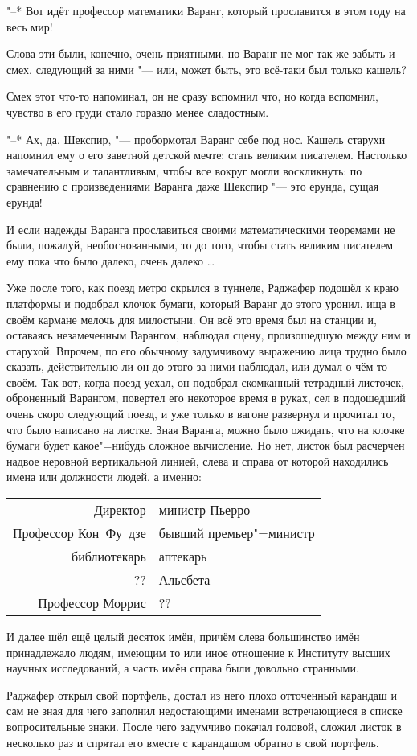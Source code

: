 "--* Вот идёт профессор математики Варанг, который прославится в этом году на
весь мир!

Слова эти были, конечно, очень приятными, но Варанг не мог так же забыть и смех,
следующий за ними "--- или, может быть, это всё-таки был только кашель?

Смех этот что-то напоминал, он не сразу вспомнил что, но когда вспомнил, чувство
в его груди стало гораздо менее сладостным.

"--* Ах, да, Шекспир, "--- пробормотал Варанг себе под нос.
Кашель старухи напомнил ему о его заветной детской мечте: стать великим
писателем.
Настолько замечательным и талантливым, чтобы все вокруг могли воскликнуть: по
сравнению с произведениями Варанга даже Шекспир "--- это ерунда, сущая ерунда!

И если надежды Варанга прославиться своими математическими теоремами не были,
пожалуй, необоснованными, то до того, чтобы стать великим писателем ему пока что
было далеко, очень далеко \ldots

Уже после того, как поезд метро скрылся в туннеле, Раджафер подошёл к краю
платформы и подобрал клочок бумаги, который Варанг до этого уронил, ища в своём
кармане мелочь для милостыни.
Он всё это время был на станции и, оставаясь незамеченным Варангом, наблюдал
сцену, произошедшую между ним и старухой.
Впрочем, по его обычному задумчивому выражению лица трудно было сказать,
действительно ли он до этого за ними наблюдал, или думал о чём-то своём.
Так вот, когда поезд уехал, он подобрал скомканный тетрадный листочек,
оброненный Варангом, повертел его некоторое время в руках, сел в подошедший
очень скоро следующий поезд, и уже только в вагоне развернул и прочитал то, что
было написано на листке.
Зная Варанга, можно было ожидать, что на клочке бумаги будет какое"=нибудь
сложное вычисление.
Но нет, листок был расчерчен надвое неровной вертикальной линией, слева и справа
от которой находились имена или должности людей, а именно:

\begin{table}[h!]
\centering
\begin{tabular}{r|l}
Директор             & министр Пьерро \\
Профессор Кон~Фу~дзе & бывший премьер"=министр \\
библиотекарь         & аптекарь \\
??                   & Альсбета \\
Профессор Моррис     & ?? \\
\end{tabular}
\end{table}

И далее шёл ещё целый десяток имён, причём слева большинство имён принадлежало
людям, имеющим то или иное отношение к Институту высших научных исследований, а
часть имён справа были довольно странными.

Раджафер открыл свой портфель, достал из него плохо отточенный карандаш и сам не
зная для чего заполнил недостающими именами встречающиеся в списке
вопросительные знаки.
После чего задумчиво покачал головой, сложил листок в несколько раз и спрятал
его вместе с карандашом обратно в свой портфель.
